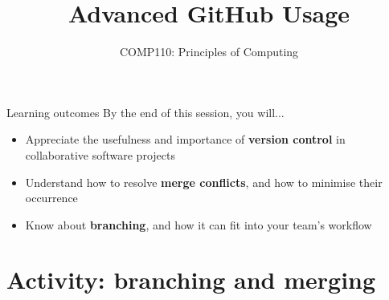 \usepackage{../../beamerthemeFalmouthGamesAcademy}
\graphicspath{ {../../} }


\usepackage[normalem]{ulem}

\usepackage{pdfpages}


\title{Advanced GitHub Usage}   
\subtitle{COMP110: Principles of Computing}

\frame{\titlepage} 

\begin{frame}{Learning outcomes}
    By the end of this session, you will...
    \begin{itemize}
        \item Appreciate the usefulness and importance of \textbf{version control}
            in collaborative software projects
        \item Understand how to resolve \textbf{merge conflicts}, and how to minimise their occurrence
        \item Know about \textbf{branching}, and how it can fit into your team's workflow
    \end{itemize}
\end{frame}




\part{Activity: branching and merging}
\frame{\partpage}


%



